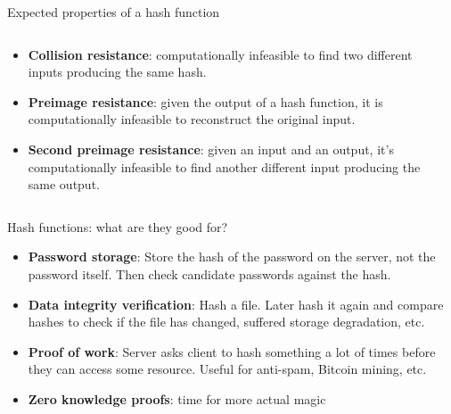 \documentclass[aspectratio=169, lualatex, handout]{beamer}
\begin{document}
\begin{frame}{Expected properties of a hash function}
	\begin{columns}[c]
		\begin{column}{0.6\textwidth}
			\begin{itemize}[<+->]
				\item \textbf{Collision resistance}: computationally infeasible to find
				      two different inputs producing the same hash.
				\item \textbf{Preimage resistance}: given the output of a hash function,
				      it is computationally infeasible to reconstruct the original input.
				\item \textbf{Second preimage resistance}: given an input and an output,
				      it's computationally infeasible to find another different input
				      producing the same output.
			\end{itemize}
		\end{column}
		\begin{column}{0.4\textwidth}
		\end{column}
	\end{columns}
\end{frame}

\begin{frame}{Hash functions: what are they good for?}
	\begin{itemize}[<+->]
		\item \textbf{Password storage}: Store the hash of the password on the server,
		      not the password itself. Then check candidate passwords against the hash.
		\item \textbf{Data integrity verification}: Hash a file. Later hash it
		      again and compare hashes to check if the file has changed, suffered storage
		      degradation, etc.
		\item \textbf{Proof of work}: Server asks client to hash something a lot of
		      times before they can access some resource. Useful for anti-spam, Bitcoin
		      mining, etc.
		\item \textbf{Zero knowledge proofs}: time for more actual magic
	\end{itemize}
\end{frame}
\end{document}
